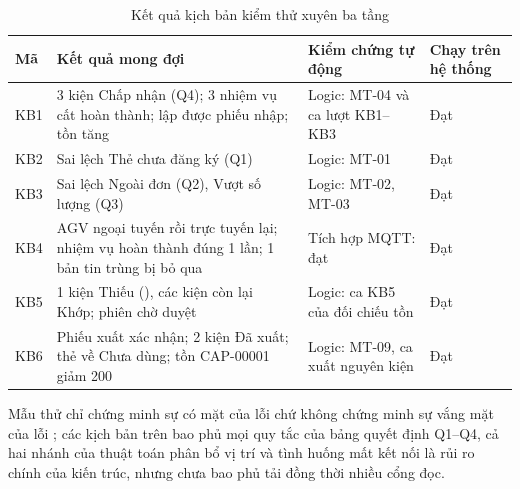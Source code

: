 \begin{table}[H]
\centering
\caption{Kết quả kịch bản kiểm thử xuyên ba tầng}
\label{tab:kqkichban}
\small
\begin{tabularx}{\textwidth}{l Y L{2.6cm} L{2.6cm}}
\toprule
\textbf{Mã} & \textbf{Kết quả mong đợi} & \textbf{Kiểm chứng tự động} & \textbf{Chạy trên hệ thống} \\
\midrule
KB1 & 3 kiện Chấp nhận (Q4); 3 nhiệm vụ cất hoàn thành; lập được phiếu nhập; tồn tăng & Logic: MT-04 và ca lượt KB1--KB3 & Đạt \\
KB2 & Sai lệch Thẻ chưa đăng ký (Q1) & Logic: MT-01 & Đạt \\
KB3 & Sai lệch Ngoài đơn (Q2), Vượt số lượng (Q3) & Logic: MT-02, MT-03 & Đạt \\
KB4 & AGV ngoại tuyến rồi trực tuyến lại; nhiệm vụ hoàn thành đúng 1 lần; 1 bản tin trùng bị bỏ qua & Tích hợp MQTT: đạt & Đạt \\
KB5 & 1 kiện Thiếu (), các kiện còn lại Khớp; phiên chờ duyệt & Logic: ca KB5 của đối chiếu tồn & Đạt \\
KB6 & Phiếu xuất xác nhận; 2 kiện Đã xuất; thẻ về Chưa dùng; tồn CAP-00001 giảm 200 & Logic: MT-09, ca xuất nguyên kiện & Đạt \\
\bottomrule
\end{tabularx}
\end{table}

Mẫu thử chỉ chứng minh sự có mặt của lỗi chứ không chứng minh sự vắng mặt của lỗi \cite[Ch.~10]{tung_qlhttt}; các kịch bản trên bao phủ mọi quy tắc của bảng quyết định Q1--Q4, cả hai nhánh của thuật toán phân bổ vị trí và tình huống mất kết nối là rủi ro chính của kiến trúc, nhưng chưa bao phủ tải đồng thời nhiều cổng đọc.
